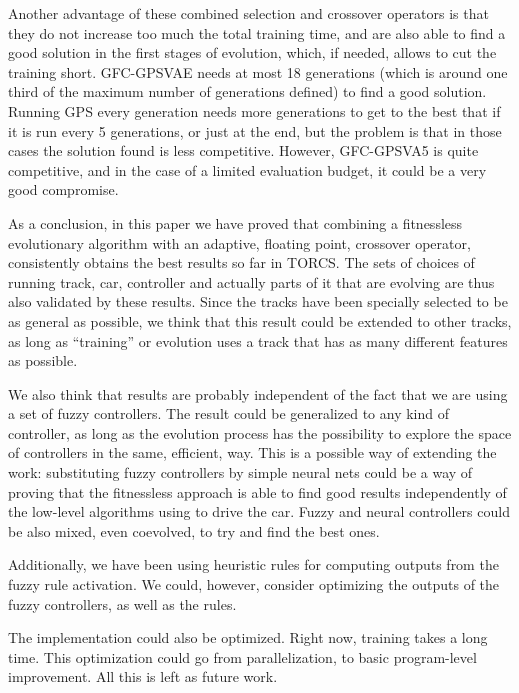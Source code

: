 \documentclass[10pt,journal,compsoc]{IEEEtran}
\begin{document}
Another advantage of these combined selection and crossover operators is that they do not
increase too much the total training time, and are also able to find a good solution in the first stages of evolution, which, if needed, allows to cut the training short. {\sf GFC-GPSVAE} needs at most 18 generations (which is around one third of the maximum number of generations defined) to find a good solution. Running GPS every generation needs more generations to get to the best that if it is run every 5 generations, or just at the end, but the problem is that in those cases the solution found is less competitive. However, {\sf GFC-GPSVA5} is quite competitive, and in the case of a limited evaluation budget, it could be a very good compromise.

As a conclusion, in this paper we have proved that combining a
fitnessless evolutionary algorithm with an adaptive, floating point,
crossover operator, consistently obtains the best results so far in
TORCS. The sets of choices of running track, car, controller and
actually parts of it that are evolving are thus also validated by
these results. Since the tracks have been specially selected to be as
general as possible, we think that this result could be extended to
other tracks, as long as ``training'' or evolution uses a track that
has as many different features as possible. %

We also think that results are probably independent of the fact that we are using a
set of fuzzy controllers. The result could be generalized to any kind
of controller, as long as the evolution process has the possibility to explore the
space of controllers in the same, efficient, way. This is a possible
way of extending the work: substituting fuzzy controllers by simple
neural nets could be a way of proving that the fitnessless approach
is able to find good results independently of the low-level algorithms
using to drive the car. Fuzzy and neural controllers could be also
mixed, even coevolved, to try and find the best ones. 

Additionally, we have been using heuristic rules for computing outputs
from the fuzzy rule activation. We could, however, consider optimizing
the outputs of the fuzzy controllers, as well as the rules.

The implementation could also be optimized. Right now, training takes
a long time. This optimization could go from parallelization, to basic
program-level improvement. All this is left as future work.
\end{document}

